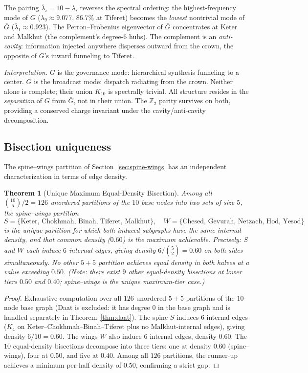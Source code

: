\documentclass[11pt,a4paper]{amsart}
\newtheorem{theorem}{Theorem}[section]
\theoremstyle{remark}
\newcommand{\bbZ}{\mathbb{Z}}
\begin{document}
The pairing $\bar{\lambda}_i = 10 - \lambda_i$ reverses the spectral
ordering: the highest-frequency mode of $G$ ($\lambda_9 \approx 9.077$,
$86.7\%$ at Tiferet) becomes the \emph{lowest} nontrivial mode of $\bar{G}$
($\bar{\lambda}_1 \approx 0.923$). The Perron--Frobenius eigenvector of
$\bar{G}$ concentrates at Keter and Malkhut (the complement's degree-$6$
hubs). The complement is an \emph{anti-cavity}: information injected
anywhere disperses outward from the crown, the opposite of $G$'s inward
funneling to Tiferet.

\emph{Interpretation.} $G$ is the governance mode: hierarchical synthesis
funneling to a center. $\bar{G}$ is the broadcast mode: dispatch radiating
from the crown. Neither alone is complete; their union $K_{10}$ is
spectrally trivial. All structure resides in the \emph{separation} of $G$
from $\bar{G}$, not in their union. The $\bbZ_2$ parity survives on both,
providing a conserved charge invariant under the cavity/anti-cavity
decomposition.

\subsection{Bisection uniqueness}
\label{sec:bisection-uniqueness}

The spine--wings partition of Section~\ref{sec:spine-wings} has an
independent characterization in terms of edge density.

\begin{theorem}[Unique Maximum Equal-Density Bisection]
\label{thm:bisection}
Among all $\binom{10}{5}/2 = 126$ unordered partitions of the $10$ base
nodes into two sets of size $5$, the spine--wings partition
\begin{equation}
S = \{\text{Keter, Chokhmah, Binah, Tiferet, Malkhut}\},\quad
W = \{\text{Chesed, Gevurah, Netzach, Hod, Yesod}\}
\end{equation}
is the unique partition for which both induced subgraphs have the same
internal density, and that common density ($0.60$) is the maximum
achievable. Precisely: $S$ and $W$ each induce $6$ internal edges, giving
density $6/\binom{5}{2} = 0.60$ on both sides simultaneously. No other
$5+5$ partition achieves equal density in both halves at a value exceeding
$0.50$. (Note: there exist $9$ other equal-density bisections at lower
tiers $0.50$ and $0.40$; spine--wings is the unique maximum-tier case.)
\end{theorem}

\begin{proof}
Exhaustive computation over all $126$ unordered $5+5$ partitions of the
$10$-node base graph (Daat is excluded: it has degree $0$ in the base graph
and is handled separately in Theorem~\ref{thm:daat}). The spine $S$
induces $6$ internal edges ($K_4$ on Keter--Chokhmah--Binah--Tiferet plus
no Malkhut-internal edges), giving density $6/10 = 0.60$. The wings $W$
also induce $6$ internal edges, density $0.60$. The $10$ equal-density
bisections decompose into three tiers: one at density $0.60$
(spine--wings), four at $0.50$, and five at $0.40$. Among all $126$
partitions, the runner-up achieves a minimum per-half density of $0.50$,
confirming a strict gap.
\end{proof}
\end{document}
